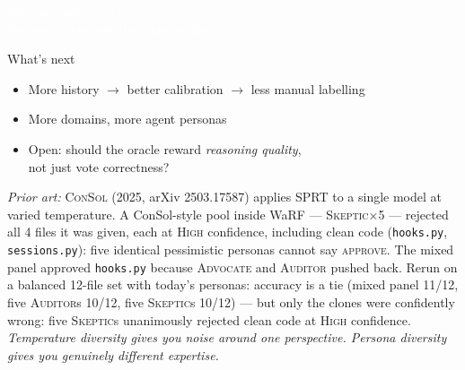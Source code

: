 \documentclass[10pt]{beamer}
\begin{document}
{
\begin{frame}[plain]
  \vfill
  \centering
  \LARGE
  \textcolor{white}{Everyone gets a vote.}\\[0.8em]
  \textcolor{white}{Not every vote gets the same weight.}
  \vfill
\end{frame}
}

\begin{frame}{What's next}
  \begin{itemize}
    \item More history $\to$ better calibration $\to$ less manual labelling

    \item More domains, more agent personas
    \item Open: should the oracle reward \textit{reasoning quality},\\
          not just vote correctness?
  \end{itemize}

  \vfill
  \small
  \textit{Prior art:}
  \textsc{ConSol} (2025, arXiv 2503.17587) applies SPRT to a single model at varied temperature.
  A ConSol-style pool inside WaRF --- \textsc{Skeptic}$\times$5 --- rejected all 4 files it was given,
  each at \textsc{High} confidence, including clean code (\texttt{hooks.py}, \texttt{sessions.py}):
  five identical pessimistic personas cannot say \textsc{approve}.
  The mixed panel approved \texttt{hooks.py} because \textsc{Advocate} and \textsc{Auditor} pushed back.
  Rerun on a balanced 12-file set with today's personas: accuracy is a tie (mixed panel 11/12, five
  \textsc{Auditor}s 10/12, five \textsc{Skeptic}s 10/12) --- but only the clones were confidently wrong:
  five \textsc{Skeptic}s unanimously rejected clean code at \textsc{High} confidence.\\[0.2em]
  \textit{Temperature diversity gives you noise around one perspective.
  Persona diversity gives you genuinely different expertise.}
\end{frame}
\end{document}

